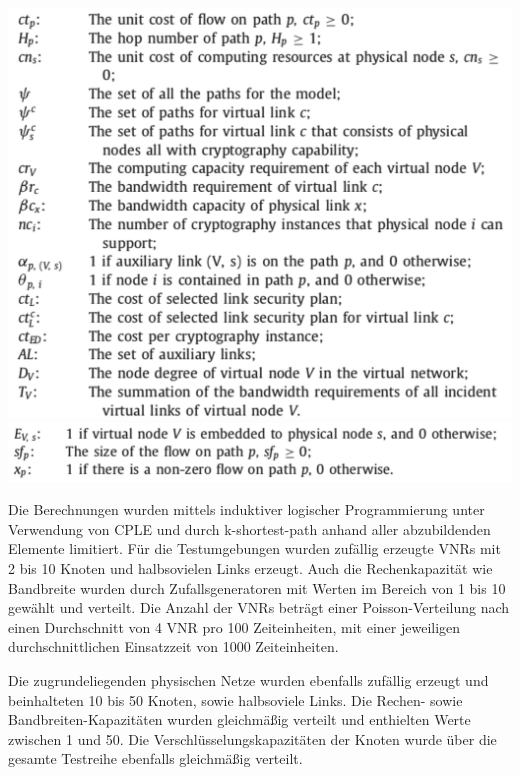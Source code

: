 \documentclass{lni}
\begin{document}
\begin{center}
	\includegraphics[width=1\textwidth]{notations.pdf}\newline
	\newline
	\includegraphics[width=1\textwidth]{variables.pdf}\newline
\end{center}

Die Berechnungen wurden mittels induktiver logischer Programmierung unter Verwendung von CPLE \cite{CPLEX} und durch k-shortest-path anhand aller abzubildenden Elemente limitiert.
Für die Testumgebungen wurden zufällig erzeugte VNRs mit 2 bis 10 Knoten und halbsovielen Links erzeugt. Auch die Rechenkapazität wie Bandbreite wurden durch Zufallsgeneratoren mit Werten im Bereich von 1 bis 10 gewählt und verteilt. Die Anzahl der VNRs beträgt einer Poisson-Verteilung nach einen Durchschnitt von 4 VNR pro 100 Zeiteinheiten, mit einer jeweiligen durchschnittlichen Einsatzzeit von 1000 Zeiteinheiten.

Die zugrundeliegenden physischen Netze wurden ebenfalls zufällig erzeugt und beinhalteten 10 bis 50 Knoten, sowie halbsoviele Links. Die Rechen- sowie Bandbreiten-Kapazitäten wurden gleichmäßig verteilt und enthielten Werte zwischen 1 und 50. Die Verschlüsselungskapazitäten der Knoten  wurde über die gesamte Testreihe ebenfalls gleichmäßig verteilt.
\end{document}
